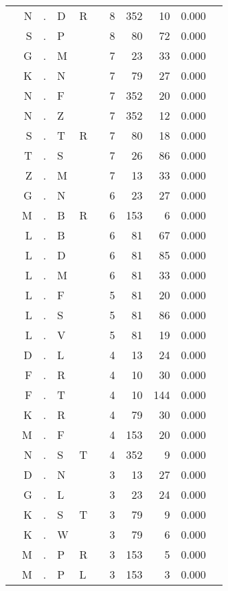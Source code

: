 \begin{longtable}{r@{ } r@{ } c@{ } l@{ } l@{ } l@{ } r r r r l }
  & N & . & D & R &   & 8 & 352 & 10 & 0.000 &  \\
  & S & . & P &   &   & 8 & 80 & 72 & 0.000 &  \\
  & G & . & M &   &   & 7 & 23 & 33 & 0.000 &  \\
  & K & . & N &   &   & 7 & 79 & 27 & 0.000 &  \\
  & N & . & F &   &   & 7 & 352 & 20 & 0.000 &  \\
  & N & . & Z &   &   & 7 & 352 & 12 & 0.000 &  \\
  & S & . & T & R &   & 7 & 80 & 18 & 0.000 &  \\
  & T & . & S &   &   & 7 & 26 & 86 & 0.000 &  \\
  & Z & . & M &   &   & 7 & 13 & 33 & 0.000 &  \\
  & G & . & N &   &   & 6 & 23 & 27 & 0.000 &  \\
  & M & . & B & R &   & 6 & 153 & 6 & 0.000 &  \\
  & L & . & B &   &   & 6 & 81 & 67 & 0.000 &  \\
  & L & . & D &   &   & 6 & 81 & 85 & 0.000 &  \\
  & L & . & M &   &   & 6 & 81 & 33 & 0.000 &  \\
  & L & . & F &   &   & 5 & 81 & 20 & 0.000 &  \\
  & L & . & S &   &   & 5 & 81 & 86 & 0.000 &  \\
  & L & . & V &   &   & 5 & 81 & 19 & 0.000 &  \\
  & D & . & L &   &   & 4 & 13 & 24 & 0.000 &  \\
  & F & . & R &   &   & 4 & 10 & 30 & 0.000 &  \\
  & F & . & T &   &   & 4 & 10 & 144 & 0.000 &  \\
  & K & . & R &   &   & 4 & 79 & 30 & 0.000 &  \\
  & M & . & F &   &   & 4 & 153 & 20 & 0.000 &  \\
  & N & . & S & T &   & 4 & 352 & 9 & 0.000 &  \\
  & D & . & N &   &   & 3 & 13 & 27 & 0.000 &  \\
  & G & . & L &   &   & 3 & 23 & 24 & 0.000 &  \\
  & K & . & S & T &   & 3 & 79 & 9 & 0.000 &  \\
  & K & . & W &   &   & 3 & 79 & 6 & 0.000 &  \\
  & M & . & P & R &   & 3 & 153 & 5 & 0.000 &  \\
  & M & . & P & L &   & 3 & 153 & 3 & 0.000 &  \\

\end{longtable}
